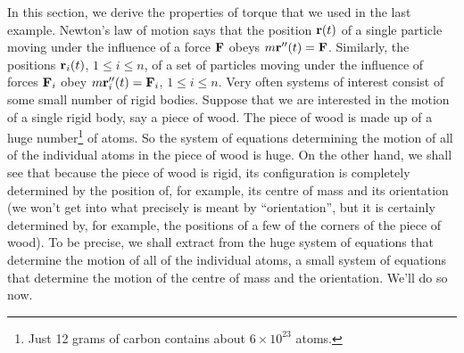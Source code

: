 In this section, we derive the properties of torque that we used in 
the last example. Newton's law of motion says that the position $\mathbf{r}(t)$ 
of a single particle moving under the influence
of a force $\mathbf{F}$ obeys $m\mathbf{r}''(t)=\mathbf{F}$. Similarly, the positions $\mathbf{r}_i(t)$, 
$1\le i\le n$, of a set of particles moving under the influence
of forces $\mathbf{F}_i$ obey $m\mathbf{r}_i''(t)=\mathbf{F}_i$, $1\le i\le n$. Very often 
systems of interest consist
of some small number of rigid bodies. Suppose that we are interested in
the motion of a single rigid body, say a piece of wood. The piece of wood
is made up of a huge number\footnote{Just 12 grams of carbon contains
about $6\times 10^{23}$ atoms.} of atoms. So the system of equations 
determining the motion of all of the individual atoms in the piece of 
wood is huge. On the other hand, we shall see that because the piece of 
wood is rigid, its configuration is completely determined by the 
position of, for example, its centre of mass and its orientation 
(we won't get into what precisely is meant by ``orientation'', but 
it is certainly determined by, for example, the positions of a few 
of the corners of the piece of wood). 
To be precise, we shall extract from the  huge system of equations 
that determine the motion of all of the individual atoms, a 
small system of equations that determine the motion of the centre of mass 
and the orientation. We'll do so now.

